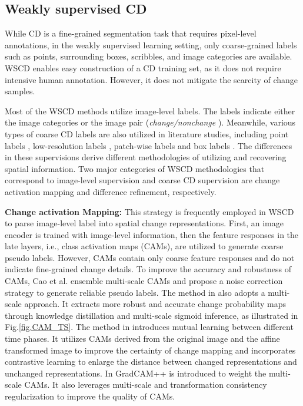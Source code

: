 \subsection{Weakly supervised CD}
While CD is a fine-grained segmentation task that requires pixel-level annotations, in the weakly supervised learning setting, only coarse-grained labels such as points, surrounding boxes, scribbles, and image categories are available. WSCD enables easy construction of a CD training set, as it does not require intensive human annotation. However, it does not mitigate the scarcity of change samples. 

Most of the WSCD methods utilize image-level labels. The labels indicate either the image categories \cite{cao2023multiscale} or the image pair (\textit{change/nonchange} \cite{dai2023siamese}). Meanwhile, various types of coarse CD labels are also utilized in literature studies, including point labels \cite{fang2023point}, low-resolution labels \cite{zheng2021weakly}, patch-wise labels \cite{qiao2024revolutionizing} and box labels \cite{khan2017forest}. The differences in these supervisions derive different methodologies of utilizing and recovering spatial information. Two major categories of WSCD methodologies that correspond to image-level supervision and coarse CD supervision are change activation mapping and difference refinement, respectively.


\textbf{Change activation Mapping:} 
This strategy is frequently employed in WSCD to parse image-level label into spatial change representations. First, an image encoder is trained with image-level information, then the feature responses in the late layers, i.e., class activation maps (CAMs), are utilized to generate coarse pseudo labels. However, CAMs contain only coarse feature responses and do not indicate fine-grained change details. To improve the accuracy and robustness of CAMs, Cao et al. \cite{cao2023multiscale} ensemble multi-scale CAMs and propose a noise correction strategy to generate reliable pseudo labels. The method in \cite{lu2024weakly} also adopts a multi-scale approach. It extracts more robust and accurate change probability maps through knowledge distillation and multi-scale sigmoid inference, as illustrated in Fig.\ref{fig.CAM_TS}. The method in \cite{zhao2024pixellevel} introduces mutual learning between different time phases. It utilizes CAMs derived from the original image and the affine transformed image to improve the certainty of change mapping and incorporates contrastive learning to enlarge the distance between changed representations and unchanged representations. In \cite{dai2023siamese} GradCAM++ is introduced to weight the multi-scale CAMs. It also leverages multi-scale and transformation consistency regularization to improve the quality of CAMs.

